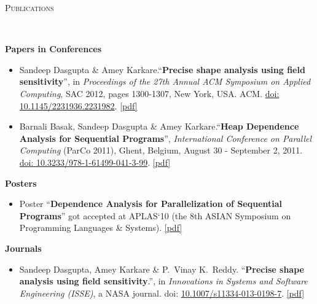 \documentclass[9pt]{article}
\newenvironment{changemargin}[2]{%
  \begin{list}{}{%
    \setlength{\topsep}{0pt}%
    \setlength{\leftmargin}{#1}%
    \setlength{\rightmargin}{#2}%
    \setlength{\listparindent}{\parindent}%
    \setlength{\itemindent}{\parindent}%
    \setlength{\parsep}{\parskip}%
  }%
  \item[]}{\end{list}
}
\newcommand{\lineover}{
	\begin{changemargin}{-0.05in}{-0.05in}
		\vspace*{-8pt}
		\hrulefill \\
		\vspace*{-2pt}
	\end{changemargin}
}
\newcommand{\header}[1]{
	\begin{changemargin}{-0.5in}{-0.5in}
		\scshape{#1}\\
  	\lineover
	\end{changemargin}
}
\newcommand{\cmnt}[1]{}
\newenvironment{body} {
	\vspace*{-16pt}
	\begin{changemargin}{-0.25in}{-0.5in}
  }	
	{\end{changemargin}
}
\begin{document}
\smallskip

\header{Publications}
\begin{body}
\vspace{14pt}
\textbf{Papers in Conferences}\\
	\vspace*{-4pt}
	\begin{itemize} \itemsep -0pt
		\item Sandeep Dasgupta \& Amey Karkare.``\textbf{Precise shape analysis using field sensitivity}'', in \emph{Proceedings of the 27th Annual ACM Symposium on Applied Computing}, SAC 2012, pages 1300-1307, New York, USA. ACM. \href{http://dx.doi.org/10.1145/2245276.2231982}{doi: 10.1145/2231936.2231982}. \href{https://dl.dropbox.com/u/86719354/sac\_2012.pdf}{[pdf]}\\

		\item Barnali Basak, Sandeep Dasgupta \& Amey Karkare.``\textbf{Heap Dependence Analysis for Sequential Programs}'', \emph{International Conference on Parallel Computing} (ParCo 2011), Ghent, Belgium, August 30 - September 2, 2011. \href{http://dx.doi.org/10.3233/978-1-61499-041-3-99}{doi: 10.3233/978-1-61499-041-3-99}.  \href{https://dl.dropbox.com/u/86719354/parco\_2011.pdf}{[pdf]} \\
                  \cmnt{
		\begin{itemize} \itemsep -0pt
			\item Published in: Applications, Tools and Techniques on the Road to Exascale Computing, 22 volume of Advances in 
				Parallel Computing, chapter: Heap Dependence Analysis for Sequential Programs, pages 99--106. IOS Press, May 2012. 
				doi: \href{http://dx.doi.org/10.3233/978-1-61499-041-3-99}{10.3233/978-1-61499-041-3-99}, isbn: 978-1-61499-040-6.
		\end{itemize}
                  }
	\end{itemize}

\textbf{Posters}\\
	\vspace*{-4pt}
	\begin{itemize} \itemsep -0pt
		\item Poster ``\textbf{Dependence Analysis for Parallelization 
		of Sequential Programs}'' got accepted at APLAS`10 (the 8th ASIAN Symposium on Programming Languages \& Systems). \href{https://dl.dropbox.com/u/86719354/poster_APLAS2010.pdf}{[pdf]}
	\end{itemize}

\textbf{Journals}\\
	\vspace{-4pt}
	\begin{itemize} \itemsep -0pt
		\item  Sandeep Dasgupta, Amey Karkare \& P.\ Vinay K.\ Reddy. ``\textbf{Precise shape analysis using field sensitivity}.'', in \emph{Innovations in Systems and Software Engineering (ISSE)}, a NASA journal.
                 doi: \href{http://www.springerlink.com/openurl.asp?genre=article&id=doi:10.1007/s11334-013-0198-7}{10.1007/s11334-013-0198-7}. \href{https://dl.dropbox.com/u/86719354/publication_isse.pdf}{[pdf]}
	\end{itemize}
\end{body}
\end{document}
